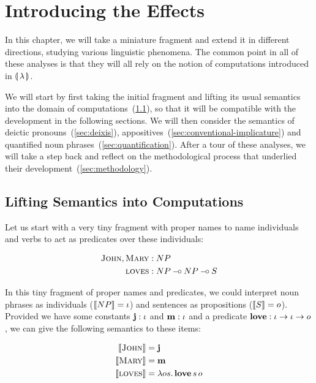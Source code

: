 \chapter{Introducing the Effects}
\label{chap:introducing-effects}

\setcounter{exx}{0}

In this chapter, we will take a miniature fragment and extend it in
different directions, studying various linguistic phenomena. The common
point in all of these analyses is that they will all rely on the notion of
computations introduced in $\llparenthesis \, \lambda \, \rrparenthesis$.

We will start by first taking the initial fragment and lifting its usual
semantics into the domain of computations~(\ref{sec:lifting-semantics}), so
that it will be compatible with the development in the following
sections. We will then consider the semantics of deictic
pronouns~(\ref{sec:deixis}),
appositives~(\ref{sec:conventional-implicature}) and quantified noun
phrases~(\ref{sec:quantification}). After a tour of these analyses, we will
take a step back and reflect on the methodological process that underlied
their development~(\ref{sec:methodology}).

\minitoc


\section{Lifting Semantics into Computations}
\label{sec:lifting-semantics}

Let us start with a very tiny fragment with proper names to name
individuals and verbs to act as predicates over these individuals:

\begin{align*}
  \textsc{John}, \textsc{Mary} &: NP \\
  \textsc{loves} &: NP \mathbin{{-}\mkern-3.5mu{\circ}} NP \mathbin{{-}\mkern-3.5mu{\circ}} S
\end{align*}

In this tiny fragment of proper names and predicates, we could interpret
noun phrases as individuals ($\llbracket NP \rrbracket = \iota$) and sentences as
propositions ($\llbracket S \rrbracket = o$). Provided we have some constants
$\textbf{j} : \iota$ and $\textbf{m} : \iota$ and a predicate
$\textbf{love} : \iota \to \iota \to o$, we can give the following semantics
to these items:

\begin{align*}
  \llbracket \textsc{John} \rrbracket &= \textbf{j} \\
  \llbracket \textsc{Mary} \rrbracket &= \textbf{m} \\
  \llbracket \textsc{loves} \rrbracket &= \lambda o s.\, \textbf{love}\,s\,o
\end{align*}


